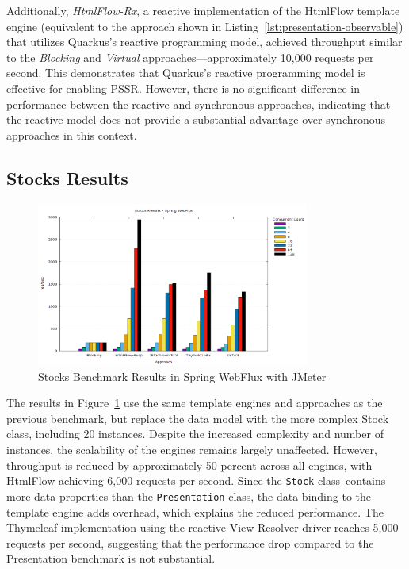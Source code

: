 Additionally, \textit{HtmlFlow-Rx}, a reactive implementation of the HtmlFlow
template engine (equivalent to the approach shown in
Listing~\ref{lst:presentation-observable}) that utilizes Quarkus's reactive
programming model, achieved throughput similar to the \textit{Blocking} and
\textit{Virtual}
approaches—approximately 10,000 requests per second. This demonstrates that
Quarkus's reactive programming model is effective for enabling PSSR\@. However,
there is no significant difference in performance between the reactive and
synchronous approaches, indicating that the reactive model does not provide a
substantial advantage over synchronous approaches in this context.

\subsection{Stocks Results}

\begin{figure}[h]
     \centering
     \includegraphics[width=0.8\textwidth]{./Graphs/stocks-webflux-jmeter.png}
     \caption{Stocks Benchmark Results in Spring WebFlux with JMeter}\label{fig:stocks-webflux-jmeter}
\end{figure}

The results in Figure~\ref{fig:stocks-webflux-jmeter} use the same template
engines and approaches as the previous benchmark, but replace the data model
with the more complex Stock class, including 20 instances. Despite the
increased complexity and number of instances, the scalability of the engines
remains largely unaffected. However, throughput is reduced by approximately 50
percent across all engines, with HtmlFlow achieving 6,000 requests per second.
Since the \texttt{Stock} class\ contains more data properties than the
\texttt{Presentation} class, the data binding to the template engine adds
overhead, which explains the reduced performance. The Thymeleaf implementation
using the reactive View Resolver driver reaches 5,000 requests per second,
suggesting that the performance drop compared to the Presentation benchmark is
not substantial.

